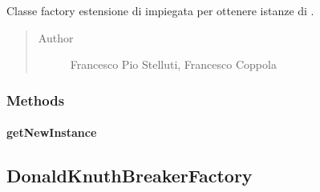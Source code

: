 \documentclass[letterpaper,10pt,italian,openany,oneside]{sphinxmanual}
\begin{document}
\begin{fulllineitems}
\label{\detokenize{source/it/unicam/cs/pa/mastermind/factories/ConsoleGameViewFactory:it.unicam.cs.pa.mastermind.factories.ConsoleGameViewFactory}}
Classe factory estensione di  impiegata per ottenere istanze di .
\begin{quote}\begin{description}
\item[{Author}] \leavevmode
Francesco Pio Stelluti, Francesco Coppola

\end{description}\end{quote}

\end{fulllineitems}



\subsubsection{Methods}
\label{\detokenize{source/it/unicam/cs/pa/mastermind/factories/ConsoleGameViewFactory:methods}}

\paragraph{getNewInstance}
\label{\detokenize{source/it/unicam/cs/pa/mastermind/factories/ConsoleGameViewFactory:getnewinstance}}

\begin{fulllineitems}
\label{\detokenize{source/it/unicam/cs/pa/mastermind/factories/ConsoleGameViewFactory:it.unicam.cs.pa.mastermind.factories.ConsoleGameViewFactory.getNewInstance()}}
\end{fulllineitems}



\subsection{DonaldKnuthBreakerFactory}
\label{\detokenize{source/it/unicam/cs/pa/mastermind/factories/DonaldKnuthBreakerFactory:donaldknuthbreakerfactory}}\label{\detokenize{source/it/unicam/cs/pa/mastermind/factories/DonaldKnuthBreakerFactory::doc}}
\end{document}
